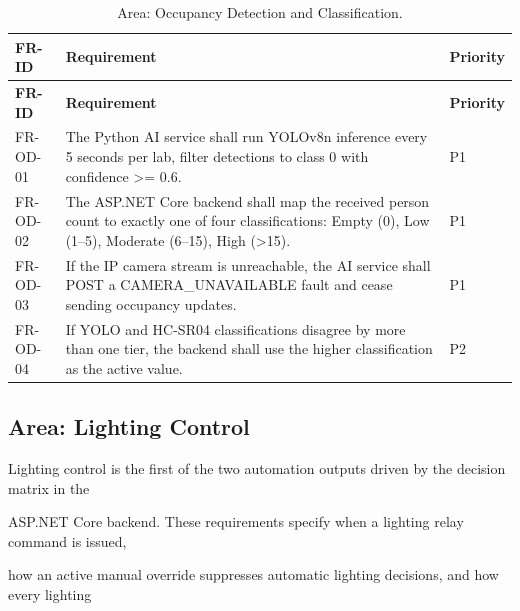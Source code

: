 \begin{longtable}{|L{2.0cm}|L{12.0cm}|L{1.5cm}|}
	\caption{Area: Occupancy Detection and Classification.} \label{tab:3-9}                                                                                                                        \\
	\hline
	\textbf{FR-ID} & \textbf{Requirement}                                                                                                                                      & \textbf{Priority} \\
	\hline
	\endfirsthead
	\hline
	\textbf{FR-ID} & \textbf{Requirement}                                                                                                                                      & \textbf{Priority} \\
	\hline
	\endhead
	\hline
	\endfoot
	\hline
	\endlastfoot
	FR-OD-01       & The Python AI service shall run YOLOv8n inference every 5 seconds per lab, filter detections to class 0 with confidence >= 0.6.                           & P1                \\
	\hline
	FR-OD-02       & The ASP.NET Core backend shall map the received person count to exactly one of four classifications: Empty (0), Low (1--5), Moderate (6--15), High (>15). & P1                \\
	\hline
	FR-OD-03       & If the IP camera stream is unreachable, the AI service shall POST a CAMERA\_UNAVAILABLE fault and cease sending occupancy updates.                        & P1                \\
	\hline
	FR-OD-04       & If YOLO and HC-SR04 classifications disagree by more than one tier, the backend shall use the higher classification as the active value.                  & P2                \\
	\hline
\end{longtable}


\subsection{Area: Lighting Control}
Lighting control is the first of the two automation outputs driven by the decision matrix in the

ASP.NET Core backend. These requirements specify when a lighting relay command is issued,

how an active manual override suppresses automatic lighting decisions, and how every lighting

